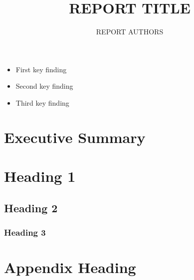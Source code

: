 \documentclass[]{aiti}
\title{REPORT TITLE}
\author{REPORT AUTHORS}
\begin{document}
\begin{keyfindings}
\begin{itemize}
\item First key finding
\item Second key finding
\item Third key finding
\end{itemize}
\end{keyfindings}

\contentspage

\chapter{Executive Summary}

\chapter{Heading 1}
\section{Heading 2}
\subsection{Heading 3}

\appendix
\chapter{Appendix Heading}
\printbibliography
\end{document}
